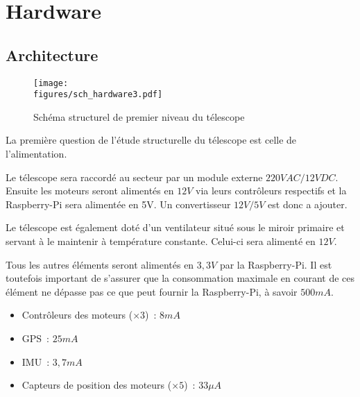 \chapter{Hardware}


\section{Architecture}

\begin{figure}[H]
    \centering
    \texttt{[image: \\figures/sch\_hardware3.pdf]}
    \decoRule
    \caption[
    Schéma structurel de premier niveau du télescope]{
    Schéma structurel de premier niveau du télescope}
    \label{fig:Schéma structurel de premier niveau du télescope}
    \end{figure}

\vspace{1cm}

La première question de l'étude structurelle du télescope est celle de l'alimentation.

Le télescope sera raccordé au secteur par un module externe $220VAC / 12VDC$. Ensuite les moteurs seront alimentés en $12V$ via leurs contrôleurs respectifs et la Raspberry-Pi sera alimentée en 5V. Un convertisseur $12V / 5V$ est donc a ajouter.

Le télescope est également doté d'un ventilateur situé sous le miroir primaire et servant à le maintenir à température constante. Celui-ci sera alimenté en $12V$.

\vspace{1cm}

Tous les autres éléments seront alimentés en $3,3V$ par la Raspberry-Pi. Il est toutefois important de s'assurer que la consommation maximale en courant de ces élément ne dépasse pas ce que peut fournir la Raspberry-Pi, à savoir $500mA$.
\begin{itemize}[label=$\bullet$]
	\item Contrôleurs des moteurs ($\times 3$)~: $8mA$
	\item GPS~: $25mA$
	\item IMU~: $3,7mA$
	\item Capteurs de position des moteurs ($\times 5$)~: $33\mu A$
	\end{itemize}

\vspace{1cm}

